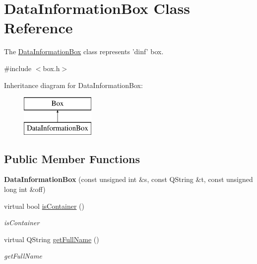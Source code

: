 \hypertarget{class_data_information_box}{\section{Data\-Information\-Box Class Reference}
\label{class_data_information_box}
}


The \hyperlink{class_data_information_box}{Data\-Information\-Box} class represents 'dinf' box.  




{\ttfamily \#include $<$box.\-h$>$}

Inheritance diagram for Data\-Information\-Box\-:\begin{figure}[H]
\begin{center}
\leavevmode
\includegraphics[height=2.000000cm]{class_data_information_box}
\end{center}
\end{figure}
\subsection*{Public Member Functions}
\begin{DoxyCompactItemize}
\item 
\hypertarget{class_data_information_box_ae74f4bcf8817ecace9af876b999bd718}{{\bfseries Data\-Information\-Box} (const unsigned int \&s, const Q\-String \&t, const unsigned long int \&off)}\label{class_data_information_box_ae74f4bcf8817ecace9af876b999bd718}

\item 
virtual bool \hyperlink{class_data_information_box_a4423b54d49079a301760361e42fd4dbf}{is\-Container} ()
\begin{DoxyCompactList}\small\item\em is\-Container \end{DoxyCompactList}\item 
virtual Q\-String \hyperlink{class_data_information_box_afb82c4d6fcfbdff60fd172a7d1e5800c}{get\-Full\-Name} ()
\begin{DoxyCompactList}\small\item\em get\-Full\-Name \end{DoxyCompactList}\end{DoxyCompactItemize}
